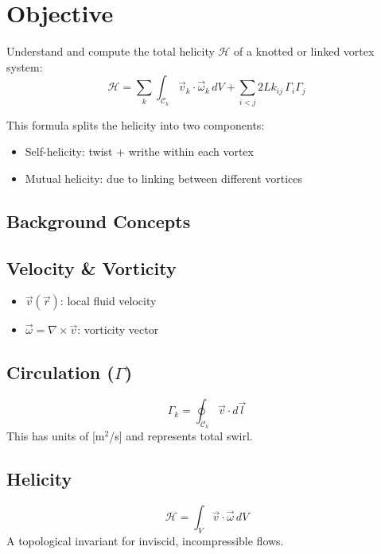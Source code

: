     \section*{Objective}
    Understand and compute the total helicity $\mathcal{H}$ of a knotted or linked vortex system:
    \begin{equation}
        \boxed{
            \mathcal{H} = \sum_{k} \int_{\mathcal{C}_k} \vec{v}_k \cdot \vec{\omega}_k \, dV + \sum_{i<j} 2Lk_{ij} \, \Gamma_i \Gamma_j
        }
    \end{equation}

    This formula splits the helicity into two components:
    \begin{itemize}
        \item Self-helicity: twist + writhe within each vortex
        \item Mutual helicity: due to linking between different vortices
    \end{itemize}

    \subsection{ Background Concepts}
    \subsection*{ Velocity \& Vorticity}
    \begin{itemize}
        \item $\vec{v}(\vec{r})$: local fluid velocity
        \item $\vec{\omega} = \nabla \times \vec{v}$: vorticity vector
    \end{itemize}

    \subsection*{ Circulation ($\Gamma$)}
    \begin{equation}
        \Gamma_k = \oint_{\mathcal{C}_k} \vec{v} \cdot d\vec{l}
    \end{equation}
    This has units of [m$^2$/s] and represents total swirl.

    \subsection*{ Helicity}
    \begin{equation}
        \mathcal{H} = \int_V \vec{v} \cdot \vec{\omega} \, dV
    \end{equation}
    A topological invariant for inviscid, incompressible flows.

